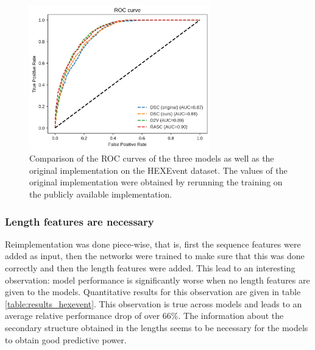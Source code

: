 \begin{figure}
	\centering\includegraphics[width=0.7\textwidth]{../visualizations/ch5-results/hexevent_cross_model_roc_auc_comparison.png} 
	\caption{Comparison of the ROC curves of the three models as well as the original implementation on the HEXEvent dataset. The values of the original implementation were obtained by rerunning the training on the publicly available implementation. }
	\label{fig:hexevent_auc}
\end{figure}






\subsubsection{Length features are necessary}
Reimplementation was done piece-wise, that is, first the sequence features were added as input, then the networks were trained to make sure that this was done correctly and then the length features were added. This lead to an interesting observation: model performance is significantly worse when no length features are given to the models. Quantitative results for this observation are given in table \ref{table:results_hexevent}. This observation is true across models and leads to an average relative performance drop of over 66\%. The information about the secondary structure obtained in the lengths seems to be necessary for the models to obtain good predictive power.

